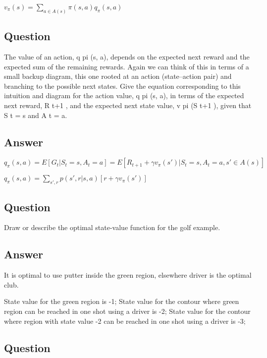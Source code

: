 \documentclass[11pt]{article}
\begin{document}
    $v_{\pi}(s) = \sum_{a \in A(s)} \pi(s, a) q_{\pi}(s,a) $

    \subsection{Question}

    The value of an action, q pi (s, a), depends on the expected next reward and the expected sum of the remaining rewards.
    Again we can think of this in terms of a small backup diagram, this one rooted at an action (state–action pair) and branching to the possible next states.
    Give the equation corresponding to this intuition and diagram for the action value, q pi (s, a), in terms of the expected next reward, R t+1 , and the expected next state value, v pi (S t+1 ), given that S t = s and A t = a.

    \subsection*{Answer}

    $ q_{\pi}(s, a) = E[G_{t}|S_{t}=s, A_{t}=a] = E[R_{t+1} + \gamma v_{\pi}(s') |S_{t}=s, A_{t}=a, s' \in A(s)] $

    $ q_{\pi}(s, a) = \sum_{s',r} p(s', r | s, a) [r + \gamma v_{\pi}(s')] $

    \subsection{Question}

    Draw or describe the optimal state-value function for the golf example.

    \subsection*{Answer}

    It is optimal to use putter inside the green region, elsewhere driver is the optimal club.

    State value for the green region is -1;
    State value for the contour where green region can be reached in one shot using a driver is -2;
    State value for the contour where region with state value -2 can be reached in one shot using a driver is -3;

    \subsection{Question}
\end{document}
